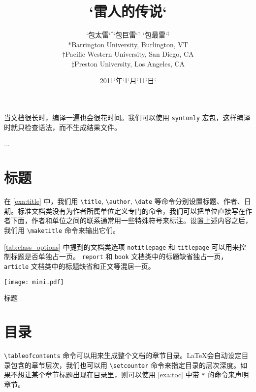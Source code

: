 当文档很长时，编译一遍也会很花时间。我们可以使用 \verb|syntonly| 宏包，这样编译时就只检查语法，而不生成结果文件。

\begin{Code}[numbers=none]
\usepackage{syntonly}
...
\syntaxonly
\end{Code}

\section{标题}

在 \autoref{exa:title} 中，我们用 \verb|\title|, \verb|\author|, \verb|\date| 等命令分别设置标题、作者、日期。标准文档类没有为作者所属单位定义专门的命令，我们可以把单位直接写在作者下面，作者和单位之间的联系通常用一些特殊符号来标注。设置上述内容之后，我们用 \verb|\maketitle| 命令来输出它们。

\autoref{tab:class_options} 中提到的文档类选项 \texttt{notitlepage} 和 \texttt{titlepage} 可以用来控制标题是否单独占一页。 \texttt{report} 和 \texttt{book} 文档类中的标题缺省独占一页，\texttt{article} 文档类中的标题缺省和正文等混居一页。

\begin{example}[h]
\begin{Code}[]
\title{`雷人的传说`}
\author{`包太雷`$^*$\quad `包巨雷`$^\dagger$\quad 
  `包最雷`$^\ddagger$\\[10pt]
$*$Barrington University, Burlington, VT\\
$\dagger$Pacific Western University, San Diego, CA\\
$\ddagger$Preston University, Los Angeles, CA}
\date{2011`年`1`月`11`日`}
\maketitle
\end{Code}
\begin{Demo}
\centering
\texttt{[image: mini.pdf]}
\end{Demo}
\caption{标题}
\label{exa:title}
\end{example}

\section{目录}

\verb|\tableofcontents| 命令可以用来生成整个文档的章节目录。\LaTeX 会自动设定目录包含的章节层次，我们也可以用 \verb|\setcounter| 命令来指定目录的层次深度。如果不想让某个章节标题出现在目录里，则可以使用 \autoref{exa:toc} 中带 \texttt{*} 的命令来声明章节。

